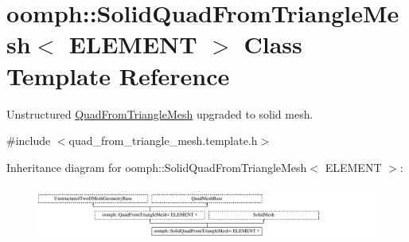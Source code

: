\hypertarget{classoomph_1_1SolidQuadFromTriangleMesh}{}\section{oomph\+:\+:Solid\+Quad\+From\+Triangle\+Mesh$<$ E\+L\+E\+M\+E\+NT $>$ Class Template Reference}
\label{classoomph_1_1SolidQuadFromTriangleMesh}


Unstructured \hyperlink{classoomph_1_1QuadFromTriangleMesh}{Quad\+From\+Triangle\+Mesh} upgraded to solid mesh.  




{\ttfamily \#include $<$quad\+\_\+from\+\_\+triangle\+\_\+mesh.\+template.\+h$>$}

Inheritance diagram for oomph\+:\+:Solid\+Quad\+From\+Triangle\+Mesh$<$ E\+L\+E\+M\+E\+NT $>$\+:\begin{figure}[H]
\begin{center}
\leavevmode
\includegraphics[height=1.806452cm]{classoomph_1_1SolidQuadFromTriangleMesh}
\end{center}
\end{figure}
